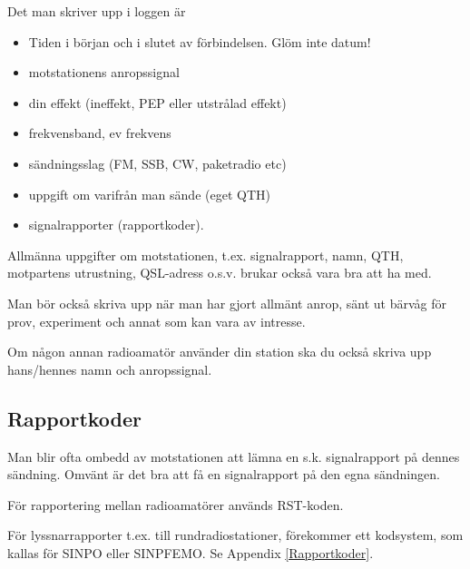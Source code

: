 Det man skriver upp i loggen är
\begin{itemize}
  \item Tiden i början och i slutet av förbindelsen. Glöm inte datum!
  \item motstationens anropssignal
  \item din effekt (ineffekt, PEP eller utstrålad effekt)
  \item frekvensband, ev frekvens
  \item sändningsslag (FM, SSB, CW, paketradio etc)
  \item uppgift om varifrån man sände (eget QTH)
  \item signalrapporter (rapportkoder).
\end{itemize}

Allmänna uppgifter om motstationen, t.ex. signalrapport, namn, QTH,
motpartens utrustning, QSL-adress o.s.v. brukar också vara bra att ha med.

Man bör också skriva upp när man har gjort allmänt anrop, sänt ut
bärvåg för prov, experiment och annat som kan vara av intresse.

Om någon annan radioamatör använder din station ska du också skriva
upp hans/hennes namn och anropssignal.

\subsection{Rapportkoder}

Man blir ofta ombedd av motstationen att lämna en s.k. signalrapport på dennes
sändning.
Omvänt är det bra att få en signalrapport på den egna sändningen.

För rapportering mellan radioamatörer används RST-koden.

För lyssnarrapporter t.ex. till rundradiostationer, förekommer ett
kodsystem, som kallas för SINPO eller SINPFEMO. Se Appendix \ref{Rapportkoder}.

